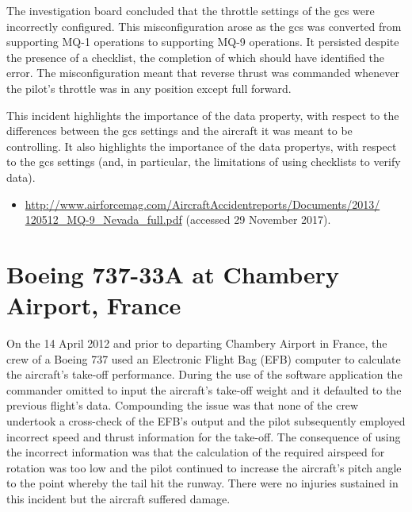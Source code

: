 The investigation board concluded that the throttle settings of the \gls{gcs} were incorrectly configured. This misconfiguration arose as the \gls{gcs} was converted from supporting MQ-1 operations to supporting MQ-9 operations. It persisted despite the presence of a checklist, the completion of which should have identified the error. The misconfiguration meant that reverse thrust was commanded whenever the pilot's throttle was in any position except full forward.

This incident highlights the importance of the  \gls{data property}, with respect to the differences between the \gls{gcs} settings and the aircraft it was meant to be controlling. It also highlights the importance of the  \glspl{data property}, with respect to the \gls{gcs} settings (and, in particular, the limitations of using checklists to verify data).

\begin{samepage}
\begin{itemize}
	\item \raggedright{\href{http://www.airforcemag.com/AircraftAccidentreports/Documents/2013/120512_MQ-9_Nevada_full.pdf}{http://www.airforcemag.com/AircraftAccidentreports/Documents/2013/ 120512\_MQ-9\_Nevada\_full.pdf} (accessed 29 November 2017).}
\end{itemize}
\end{samepage}


\section{Boeing 737-33A at Chambery Airport, France} \label{bkm:incacc:737-33A} 
On the 14 April 2012 and prior to departing Chambery Airport in France, the crew of a Boeing 737 used an Electronic Flight Bag (EFB) computer to calculate the aircraft’s take-off performance. During the use of the software application the commander omitted to input the aircraft’s take-off weight and it defaulted to the previous flight’s data. Compounding the issue was that none of the crew undertook a cross-check of the EFB’s output and the pilot subsequently employed incorrect speed and thrust \gls{information} for the take-off. The consequence of using the incorrect \gls{information} was that the calculation of the required airspeed for rotation was too low and the pilot continued to increase the aircraft’s pitch angle to the point whereby the tail hit the runway. There were no injuries sustained in this incident but the aircraft suffered damage.

